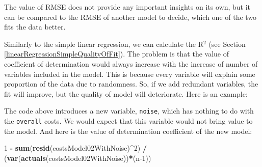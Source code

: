 \documentclass[
]{book}
\newenvironment{Shaded}{\begin{snugshade}}{\end{snugshade}}
\newcommand{\AttributeTok}[1]{\textcolor[rgb]{0.13,0.29,0.53}{#1}}
\newcommand{\CommentTok}[1]{\textcolor[rgb]{0.56,0.35,0.01}{\textit{#1}}}
\newcommand{\DecValTok}[1]{\textcolor[rgb]{0.00,0.00,0.81}{#1}}
\newcommand{\FunctionTok}[1]{\textcolor[rgb]{0.13,0.29,0.53}{\textbf{#1}}}
\newcommand{\NormalTok}[1]{#1}
\newcommand{\OtherTok}[1]{\textcolor[rgb]{0.56,0.35,0.01}{#1}}
\newcommand{\SpecialCharTok}[1]{\textcolor[rgb]{0.81,0.36,0.00}{\textbf{#1}}}
\newcommand{\StringTok}[1]{\textcolor[rgb]{0.31,0.60,0.02}{#1}}
\theoremstyle{definition}
\theoremstyle{definition}
\theoremstyle{definition}
\theoremstyle{definition}
\theoremstyle{remark}
\begin{document}
The value of RMSE does not provide any important insights on its own, but it can be compared to the RMSE of another model to decide, which one of the two fits the data better.

Similarly to the simple linear regression, we can calculate the R\(^2\) (see Section \ref{linearRegressionSimpleQualityOfFit}). The problem is that the value of coefficient of determination would always increase with the increase of number of variables included in the model. This is because every variable will explain some proportion of the data due to randomness. So, if we add redundant variables, the fit will improve, but the quality of model will deteriorate. Here is an example:

\begin{Shaded}
\end{Shaded}

The code above introduces a new variable, \texttt{noise}, which has nothing to do with the \texttt{overall} costs. We would expect that this variable would not bring value to the model. And here is the value of determination coefficient of the new model:

\begin{Shaded}
\begin{Highlighting}[]
\DecValTok{1} \SpecialCharTok{{-}} \FunctionTok{sum}\NormalTok{(}\FunctionTok{resid}\NormalTok{(costsModel02WithNoise)}\SpecialCharTok{\^{}}\DecValTok{2}\NormalTok{) }\SpecialCharTok{/}
\NormalTok{    (}\FunctionTok{var}\NormalTok{(}\FunctionTok{actuals}\NormalTok{(costsModel02WithNoise))}\SpecialCharTok{*}\NormalTok{(n}\DecValTok{{-}1}\NormalTok{))}
\end{Highlighting}
\end{Shaded}
\end{document}
